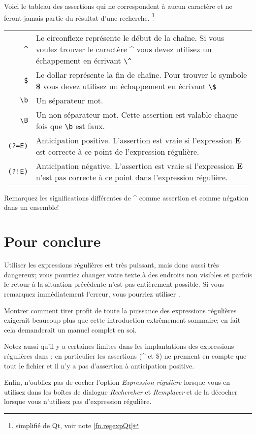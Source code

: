 Voici le tableau des \og assertions\fg{} qui ne correspondent à aucun caractère et ne feront jamais partie du résultat d'une recherche. \footnote{simplifié de Qt, voir note \ref{fn.regexpQt}}
\smallskip

\noindent\begin{tabular}{Rp{113mm}}
\toprule
\verb|^| & Le circonflexe représente le début de la chaîne. Si vous voulez trouver le caractère \textbf{\^{}} vous devez utilisez un échappement en écrivant \verb|\^|\\
\verb|$| & Le dollar représente la fin de chaîne. Pour trouver le symbole \textbf{\$} vous devez utilisez un échappement en écrivant \verb|\$|\\  
\verb|\b| & Un séparateur mot.\\
\verb|\B| & Un non-séparateur mot. Cette assertion est valable chaque fois que \verb|\b| est faux.\\
\verb|(?=E)| & Anticipation positive. L'assertion est vraie si l'expression \textbf{E} est correcte à ce point de l'expression régulière.\\
\verb|(?!E)| & Anticipation négative. L'assertion est vraie si l'expression \textbf{E} n'est pas correcte à ce point dans l'expression régulière.\\
\bottomrule
\end{tabular}
\smallskip

Remarquez les significations différentes de \textbf{\^{}} comme assertion et comme négation dans un ensemble!

\section{Pour conclure}

Utiliser les expressions régulières est très puissant, mais donc aussi très dangereux; vous pourriez changer votre texte à des endroits non visibles et parfois le retour à la situation précédente n'est pas entièrement possible. Si vous remarquez immédiatement l'erreur, vous pourriez utiliser \mbox{}.

Montrer comment tirer profit de toute la puissance des expressions régulières exigerait beaucoup plus que cette introduction extrêmement sommaire; en fait cela demanderait un manuel complet en soi.

Notez aussi qu'il y a certaines limites dans les implantations des expressions régulières dans \Tw; en particulier les assertions (\^{} et \$) ne prennent en compte que tout le fichier et il n'y a pas d'assertion à anticipation positive.

Enfin, n'oubliez pas de \og cocher\fg{} l'option \textsl{Expression régulière} lorsque vous en utilisez dans les boîtes de dialogue \emph{Rechercher} et \emph{Remplacer} et de la décocher lorsque vous n'utilisez pas d'expression régulière.

